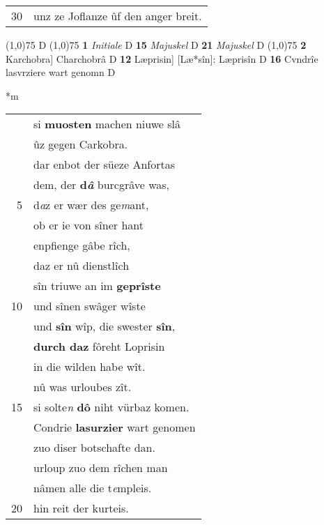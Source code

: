 \documentclass[8pt,a4paper,notitlepage]{article}
\begin{document}
\begin{table}[ht]
\begin{minipage}[t]{0.5\linewidth}
\begin{tabular}{rl}
30 & unz ze Joflanze ûf den anger breit.\\ 
\end{tabular}
\scriptsize
\line(1,0){75} \newline
D \newline
\line(1,0){75} \newline
\textbf{1} \textit{Initiale} D  \textbf{15} \textit{Majuskel} D  \textbf{21} \textit{Majuskel} D  \newline
\line(1,0){75} \newline
\textbf{2} Karchobra] Charchobrâ D \textbf{12} Læprisin] [Læ*sîn]: Læprisîn D \textbf{16} Cvndrîe lasvrziere wart genomn D \newline
\end{minipage}
\hspace{0.5cm}
\begin{minipage}[t]{0.5\linewidth}
\small
\begin{center}*m
\end{center}
\begin{tabular}{rl}
 & si \textbf{muosten} machen niuwe slâ\\ 
 & ûz gegen Carkobra.\\ 
 & dar enbot der süeze Anfortas\\ 
 & dem, der \textbf{d\textit{â}} burcgrâve was,\\ 
5 & d\textit{a}z er wær des ge\textit{m}ant,\\ 
 & ob er ie von sîner hant\\ 
 & enpfienge gâbe rîch,\\ 
 & daz er nû dienstlîch\\ 
 & sîn triuwe an im \textbf{geprîste}\\ 
10 & und sînen swâger wîste\\ 
 & und \textbf{sîn} wîp, die swester \textbf{sîn},\\ 
 & \textbf{durch daz} fôreht Loprisin\\ 
 & in die wilden habe wît.\\ 
 & nû was urloubes zît.\\ 
15 & si solte\textit{n} \textbf{dô} niht vürbaz komen.\\ 
 & Condrie \textbf{lasurzier} wart genomen\\ 
 & zuo diser botschafte dan.\\ 
 & urloup zuo dem rîchen man\\ 
 & nâmen alle die t\textit{e}mpleis.\\ 
20 & hin reit der kurteis.\\ 

\end{tabular}
\end{minipage}
\end{table}
\end{document}
